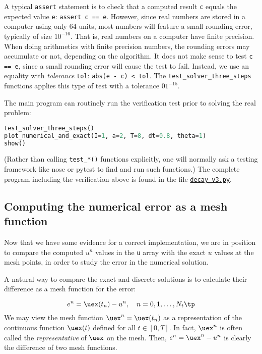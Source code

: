 \documentclass[graybox,sectrefs,envcountresetchap,open=right,final]{svmonodo}
\begin{document}
\noindent
A typical \texttt{assert} statement is to check that a computed result \texttt{c}
equals the expected value \texttt{e}: \texttt{assert c == e}. However, since real
numbers are stored in a computer using only 64 units, most numbers
will feature a small rounding error, typically of size $10^{-16}$.
That is, real numbers on a computer have finite precision. When doing
arithmetics with finite precision numbers, the rounding errors may
accumulate or not, depending on the algorithm.  It does not make sense
to test \texttt{c == e}, since a small rounding error will cause the test to
fail. Instead, we use an equality with \emph{tolerance} \texttt{tol}: \texttt{abs(e - c) < tol}. The \Verb!test_solver_three_steps! functions applies this type of
test with a tolerance $01^{-15}$.

The main program can routinely run the verification test prior to
solving the real problem:





\begin{lstlisting}[language=python,style=blue1_bluegreen]
test_solver_three_steps()
plot_numerical_and_exact(I=1, a=2, T=8, dt=0.8, theta=1)
show()

\end{lstlisting}

(Rather than calling \Verb!test_*()! functions explicitly, one will
normally ask a testing framework like nose
or pytest to find and run such functions.)
The complete program including the verification above is
found in the file \href{{http://tinyurl.com/ofkw6kc/alg/decay_v3.py}}{\nolinkurl{decay_v3.py}}.

\subsection{Computing the numerical error as a mesh function}
\label{decay:computing:error}

Now that we have some evidence for a correct implementation, we are in
position to compare the computed $u^n$ values in the \texttt{u} array with
the exact $u$ values at the mesh points, in order to study the error
in the numerical solution.


A natural way to compare the exact and discrete solutions is to
calculate their difference as a mesh function for the error:

\begin{equation}
e^n = \uex(t_n) - u^n,\quad n=0,1,\ldots,N_t \tp
\end{equation}
We may view the mesh function
$\uex^n = \uex(t_n)$ as a representation of the continuous function $\uex(t)$
defined for all $t\in [0,T]$. In fact,
$\uex^n$ is often called the \emph{representative} of
$\uex$ on the mesh. Then, $e^n = \uex^n - u^n$ is clearly
the difference of two mesh functions.
\end{document}
